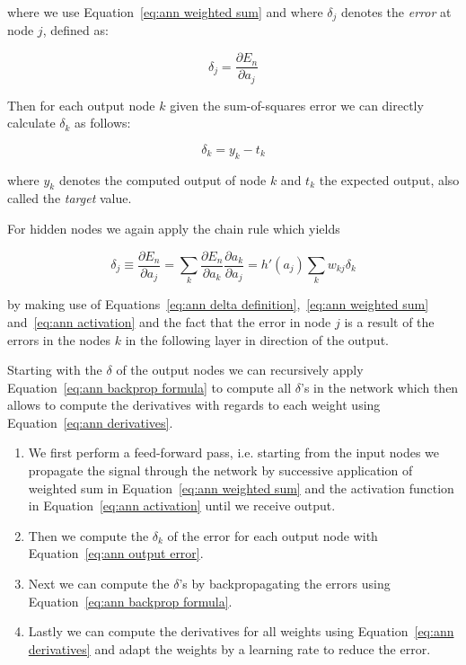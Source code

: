 where we use Equation~\ref{eq:ann weighted sum} and where $\delta_j$ denotes the \emph{error} at node $j$, defined as:

\begin{equation}
	\delta_j = \frac{\partial E_n}{\partial a_j}
	\label{eq:ann delta definition}
\end{equation}

Then for each output node $k$ given the sum-of-squares error we can directly calculate $\delta_k$ as follows:

\begin{equation}
	\delta_k = y_k - t_k
	\label{eq:ann output error}
\end{equation}

where $y_k$ denotes the computed output of node $k$ and $t_k$ the expected output, also called the \emph{target} value.

For hidden nodes we again apply the chain rule which yields

\begin{equation}
	\delta_j \equiv \frac{\partial E_n}{\partial a_j} = \sum_k \frac{\partial E_n}{\partial a_k} \frac{\partial a_k}{\partial a_j}
	= h'(a_j) \sum_k w_{kj}\delta_k
	\label{eq:ann backprop formula}
\end{equation}

by making use of Equations~\ref{eq:ann delta definition},~\ref{eq:ann weighted sum} and~\ref{eq:ann activation} and the fact that the error in node $j$ is a result of the errors in the nodes $k$ in the following layer in direction of the output.

Starting with the $\delta$ of the output nodes we can recursively apply Equation~\ref{eq:ann backprop formula} to compute all $\delta$'s in the network which then allows to compute the derivatives with regards to each weight using Equation~\ref{eq:ann derivatives}.

\begin{enumerate}
  \item We first perform a feed-forward pass, i.e. starting from the input nodes we propagate the signal through the network by successive application of weighted sum in Equation~\ref{eq:ann weighted sum} and  the activation function in Equation~\ref{eq:ann activation} until we receive output.
  \item Then we compute the $\delta_k$ of the error for each output node with Equation~\ref{eq:ann output error}.
	\item Next we can compute the $\delta$'s by backpropagating the errors using Equation~\ref{eq:ann backprop formula}.
	\item Lastly we can compute the derivatives for all weights using Equation~\ref{eq:ann derivatives} and adapt the weights by a learning rate to reduce the error.
\end{enumerate}

